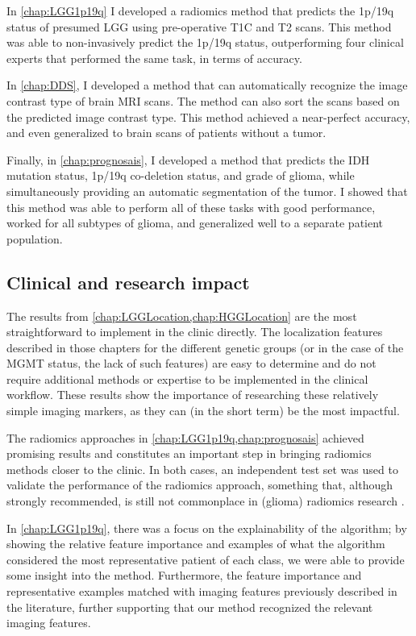 In \cref{chap:LGG1p19q} I developed a radiomics method that predicts the 1p/19q status of presumed \gls{LGG} using pre-operative \acrlong{T1C} and \acrlong{T2} scans.
This method was able to non-invasively predict the 1p/19q status, outperforming four clinical experts that performed the same task, in terms of accuracy.

In \cref{chap:DDS}, I developed a method that can automatically recognize the image contrast type of brain \gls{MRI} scans.
The method can also sort the scans based on the predicted image contrast type.
This method achieved a near-perfect accuracy, and even generalized to brain scans of patients without a \gls{tumor}.

Finally, in \cref{chap:prognosais}, I developed a method that predicts the \gls{IDH} mutation status, 1p/19q co-deletion status, and grade of glioma, while simultaneously providing an automatic segmentation of the \gls{tumor}.
I showed that this method was able to perform all of these tasks with good performance, worked for all subtypes of glioma, and generalized well to a separate patient population.


\subsection{Clinical and research impact}

The results from \cref{chap:LGGLocation,chap:HGGLocation} are the most straightforward to implement in the clinic directly.
The localization features described in those chapters for the different genetic groups (or in the case of the \gls{MGMT} status, the lack of such features) are easy to determine and do not require additional methods or expertise to be implemented in the clinical workflow.
These results show the importance of researching these relatively simple imaging markers, as they can (in the short term) be the most impactful.

The radiomics approaches in \cref{chap:LGG1p19q,chap:prognosais} achieved promising results and constitutes an important step in bringing radiomics methods closer to the clinic.
In both cases, an independent test set was used to validate the performance of the radiomics approach, something that, although strongly recommended, is still not commonplace in (glioma) radiomics research \autocite{gillies2016radiomics, rizzo2018radiomics, lohmann2020radiomics, yip2016applicationsradiomics}.

In \cref{chap:LGG1p19q}, there was a focus on the explainability of the algorithm; by showing the relative feature importance and examples of what the algorithm considered the most representative patient of each class, we were able to provide some insight into the method.
Furthermore, the feature importance and representative examples matched with imaging features previously described in the literature, further supporting that our method recognized the relevant imaging features.

